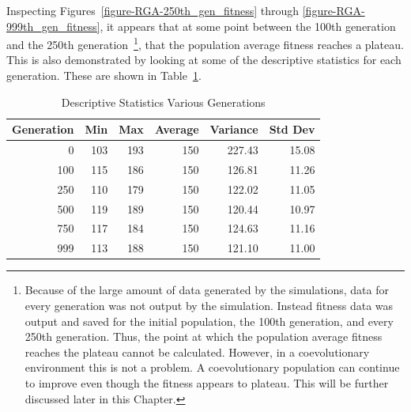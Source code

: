 Inspecting Figures~\ref{figure-RGA-250th_gen_fitness} through
\ref{figure-RGA-999th_gen_fitness}, it appears that at some point between the
100th generation and the 250th generation~\footnote{Because of the large amount
of data generated by the simulations, data for every generation was not output
by the simulation. Instead fitness data was output and saved for the initial
population, the 100th generation, and every 250th generation. Thus, the point at
which the population average fitness reaches the plateau cannot be calculated.
However, in a coevolutionary environment this is not a problem. A coevolutionary
population can continue to improve even though the fitness appears to plateau.
This will be further discussed later in this Chapter.}, that the population
average fitness reaches a plateau. This is also demonstrated by looking at some
of the descriptive statistics for each generation. These are shown in
Table~\ref{table-stats-for-s1024-n100-fo}.

\begin{table}[ht]
\caption{Descriptive Statistics Various Generations}
\begin{center}
\begin{tabular}{ | r || r | r | r | r | r |}
\hline                        
Generation & Min & Max & Average & Variance & Std Dev \\ \hline \hline
0   & 103 & 193 & 150 & 227.43 & 15.08 \\ \hline
100 & 115 & 186 & 150 & 126.81 & 11.26 \\ \hline 
250 & 110 & 179 & 150 & 122.02 & 11.05 \\ \hline
500 & 119 & 189 & 150 & 120.44 & 10.97 \\ \hline
750 & 117 & 184 & 150 & 124.63 & 11.16 \\ \hline
999 & 113 & 188 & 150 & 121.10 & 11.00 \\ \hline
\end{tabular}
\label{table-stats-for-s1024-n100-fo}
\end{center}
\end{table}

